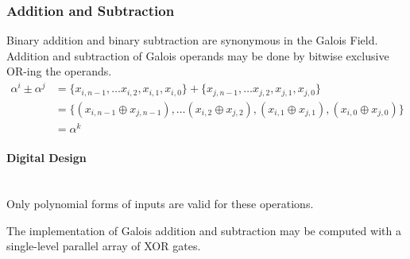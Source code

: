 \subsubsection{Addition and Subtraction} Binary addition and binary subtraction
are synonymous in the Galois Field. Addition and subtraction of Galois operands
may be done by bitwise exclusive OR-ing the operands.
    \begin{equation*}
        \begin{split}
            \alpha^{i} \pm \alpha^{j} & = \{ x_{i, n-1}, \ldots x_{i, 2},
            x_{i, 1}, x_{i, 0} \} + \{ x_{j, n-1}, \ldots x_{j, 2}, x_{j, 1},
            x_{j, 0} \} \\
            & = \{(x_{i, n-1} \oplus x_{j,n-1}), \ldots (x_{i, 2} \oplus x_{j,
            2}), (x_{i, 1}\oplus x_{j, 1}), (x_{i, 0}\oplus x_{j, 0})\} \\
            & = \alpha^{k}
        \end{split}
    \end{equation*}

    \paragraph{{\small Digital Design}} \leavevmode \\ Only polynomial forms of
    inputs are valid for these operations.

    The implementation of Galois addition and subtraction may be computed with
    a single-level parallel array of XOR gates.
